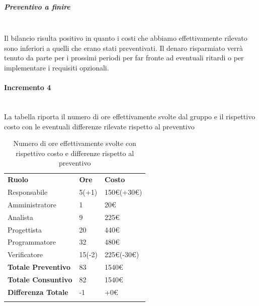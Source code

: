 \subparagraph*{Preventivo a finire} \mbox{} \\
Il bilancio risulta positivo in quanto i costi che abbiamo effettivamente rilevato sono inferiori a quelli che erano stati preventivati. Il denaro risparmiato verrà tenuto da parte per i prossimi periodi per far fronte ad eventuali ritardi o per implementare i requisiti opzionali.


\paragraph*{Incremento 4}  \mbox{} \\
La tabella riporta il numero di ore effettivamente svolte dal gruppo e il rispettivo costo con le eventuali differenze rilevate rispetto al preventivo
\begin{longtable} {							
		>{}p{40mm}  
		>{}p{20mm}	
		>{}p{28mm}			
	}			
	\rowcolor{gray!50}
	
	\textbf{Ruolo}            & \textbf{Ore} & \textbf{Costo}       \TBstrut \\
	Responsabile              & 5(+1)        & 150\euro(+30\euro)   \TBstrut \\
	Amministratore            & 1            & 20\euro              \TBstrut \\
	Analista                  & 9            & 225\euro             \TBstrut \\
	Progettista               & 20           & 440\euro             \TBstrut \\
	Programmatore             & 32           & 480\euro             \TBstrut \\
	Verificatore              & 15(-2)       & 225\euro(-30\euro)   \TBstrut \\
	\textbf{Totale Preventivo}& 83           & 1540\euro            \TBstrut \\	
	\textbf{Totale Consuntivo}& 82           & 1540\euro            \TBstrut \\	
	\textbf{Differenza Totale}& -1           & +0\euro              \TBstrut \\
	\rowcolor{white}
	\caption{Numero di ore effettivamente svolte con rispettivo costo e differenze rispetto al preventivo}	
\end{longtable}

